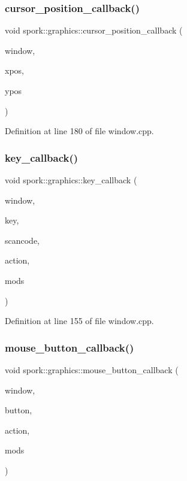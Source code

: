 \subsubsection{\texorpdfstring{cursor\+\_\+position\+\_\+callback()}{cursor\_position\_callback()}}
{\footnotesize\ttfamily void spork\+::graphics\+::cursor\+\_\+position\+\_\+callback (\begin{DoxyParamCaption}\item[{G\+L\+F\+Wwindow $\ast$}]{window,  }\item[{double}]{xpos,  }\item[{double}]{ypos }\end{DoxyParamCaption})}



Definition at line 180 of file window.\+cpp.

\mbox{\label{namespacespork_1_1graphics_ab17e028b0e60f8a7a1ab3c9902f07d13}} 
\subsubsection{\texorpdfstring{key\+\_\+callback()}{key\_callback()}}
{\footnotesize\ttfamily void spork\+::graphics\+::key\+\_\+callback (\begin{DoxyParamCaption}\item[{G\+L\+F\+Wwindow $\ast$}]{window,  }\item[{int}]{key,  }\item[{int}]{scancode,  }\item[{int}]{action,  }\item[{int}]{mods }\end{DoxyParamCaption})}



Definition at line 155 of file window.\+cpp.

\mbox{\label{namespacespork_1_1graphics_a7ae98eeafa21bcd896da2ec50d75afff}} 
\subsubsection{\texorpdfstring{mouse\+\_\+button\+\_\+callback()}{mouse\_button\_callback()}}
{\footnotesize\ttfamily void spork\+::graphics\+::mouse\+\_\+button\+\_\+callback (\begin{DoxyParamCaption}\item[{G\+L\+F\+Wwindow $\ast$}]{window,  }\item[{int}]{button,  }\item[{int}]{action,  }\item[{int}]{mods }\end{DoxyParamCaption})}




